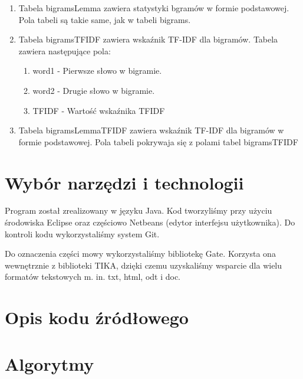 \documentclass[11pt]{article}
\begin{document}
\begin{enumerate}
\begin{enumerate}
  \end{enumerate}
  \item Tabela bigramsLemma zawiera statystyki bgramów w formie podstawowej. Pola tabeli są takie same, jak w tabeli bigrams.
  \item Tabela bigramsTFIDF zawiera wskaźnik TF-IDF dla bigramów. Tabela zawiera następujące pola:
  \begin{enumerate}
     \item word1 - Pierwsze słowo w bigramie.
     \item word2 - Drugie słowo w bigramie.
     \item  TFIDF - Wartość wskaźnika TFIDF
  \end{enumerate}
  \item Tabela bigramsLemmaTFIDF zawiera wskaźnik TF-IDF dla bigramów w formie podstawowej.
  Pola tabeli pokrywaja się z polami tabel bigramsTFIDF
\end{enumerate}
\section{Wybór narzędzi i technologii}
Program został zrealizowany w języku Java.
Kod tworzyliśmy przy użyciu środowiska Eclipse oraz częściowo Netbeans (edytor interfejsu użytkownika).
Do kontroli kodu wykorzystaliśmy system Git.

Do oznaczenia części mowy wykorzystaliśmy bibliotekę Gate.
Korzysta ona wewnętrznie z biblioteki TIKA, dzięki czemu uzyskaliśmy wsparcie dla wielu formatów tekstowych m. in. txt, html, odt i doc.

\section{Opis kodu źródłowego}

\section{Algorytmy}
\end{document}
